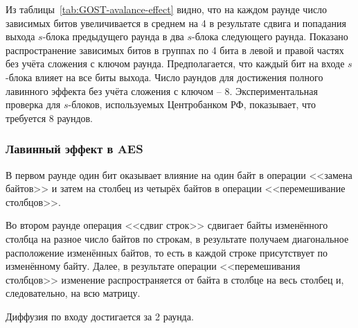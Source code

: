 Из таблицы~\ref{tab:GOST-avalance-effect} видно, что на каждом раунде число зависимых битов увеличивается в среднем на 4 в результате сдвига и попадания выхода $s$-блока предыдущего раунда в два $s$-блока следующего раунда. Показано распространение зависимых битов в группах по 4 бита в левой и правой частях без учёта сложения с ключом раунда. Предполагается, что каждый бит на входе $s$-блока влияет на все биты выхода. Число раундов для достижения полного лавинного эффекта без учёта сложения с ключом -- 8. Экспериментальная проверка для $s$-блоков, используемых Центробанком РФ, показывает, что требуется 8 раундов.


\subsubsection{Лавинный эффект в AES}

В первом раунде один бит оказывает влияние на один байт в операции <<замена байтов>> и затем на столбец из четырёх байтов в операции <<перемешивание столбцов>>.

Во втором раунде операция <<сдвиг строк>> сдвигает байты изменённого столбца на разное число байтов по строкам, в результате получаем диагональное расположение изменённых байтов, то есть в каждой строке присутствует по изменённому байту. Далее, в результате операции <<перемешивания столбцов>> изменение распространяется от байта в столбце на весь столбец и, следовательно, на всю матрицу.

Диффузия по входу достигается за 2 раунда.
